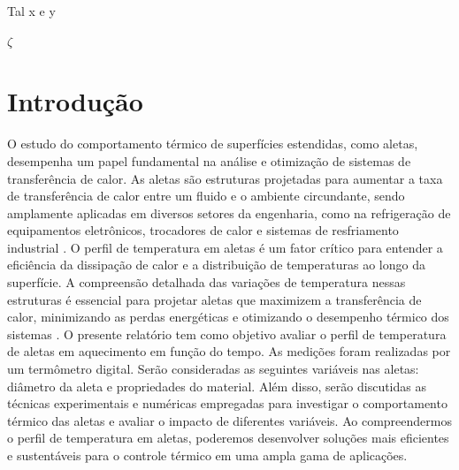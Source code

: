 \documentclass[12pt,openright,twoside,a4paper]{abntex2}
\begin{document}
\imprimircapa

\imprimirfolhaderosto*

\begin{resumo}
	Tal x e y
\end{resumo}

\begin{simbolos}

	\item $\zeta$
	
	
	
	
\end{simbolos}



\tableofcontents


\textual



\chapter{Introdução}\label{ch: Introdução}
O estudo do comportamento térmico de superfícies estendidas, como aletas, desempenha um papel fundamental na análise e otimização de sistemas de transferência de calor. As aletas são estruturas projetadas para aumentar a taxa de transferência de calor entre um fluido e o ambiente circundante, sendo amplamente aplicadas em diversos setores da engenharia, como na refrigeração de equipamentos eletrônicos, trocadores de calor e sistemas de resfriamento industrial \cite{incropera2008}. %
O perfil de temperatura em aletas é um fator crítico para entender a eficiência da dissipação de calor e a distribuição de temperaturas ao longo da superfície. A compreensão detalhada das variações de temperatura nessas estruturas é essencial para projetar aletas que maximizem a transferência de calor, minimizando as perdas energéticas e otimizando o desempenho térmico dos sistemas \cite{incropera2008}.
O presente relatório tem como objetivo avaliar o perfil de temperatura de aletas em aquecimento em função do tempo. As medições foram realizadas por um termômetro digital.
Serão consideradas as seguintes variáveis nas aletas: diâmetro da aleta e propriedades do material. Além disso, serão discutidas as técnicas experimentais e numéricas empregadas para investigar o comportamento térmico das aletas e avaliar o impacto de diferentes variáveis.
Ao compreendermos o perfil de temperatura em aletas, poderemos desenvolver soluções mais eficientes e sustentáveis para o controle térmico em uma ampla gama de aplicações.
\end{document}
